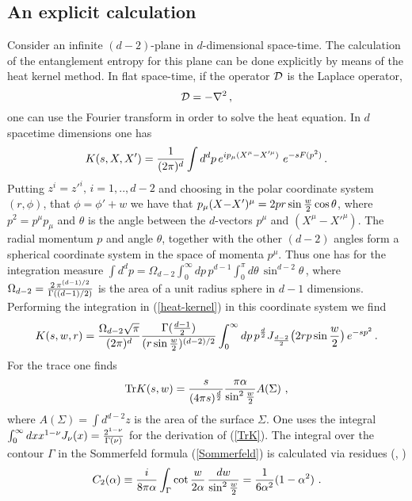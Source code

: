 \documentclass[12pt]{article}
\def\Tr{\hbox{Tr}}
\def\be{\begin{eqnarray}}
\def\ee{\end{eqnarray}}
\def\lb{\label}
\def\o{\over}
\begin{document}
\subsection{An explicit calculation}
\lb{Explicit-calculation}
Consider an infinite $(d-2)$-plane in $d$-dimensional space-time. The calculation of the entanglement entropy for this plane can be done explicitly
by means of the  heat kernel method.
In flat space-time, if the operator $\cal D$ is the Laplace operator,
$$
{\cal D}=-\nabla^2\, ,
$$
 one can use the Fourier transform  in order to solve the heat equation. In $d$ spacetime dimensions one has
 \begin{equation}
  K(s,X,X')={1\over (2\pi)^d}\int d^dp \,e^{ip_\mu(X^\mu{-}X'^\mu)}~e^{-sF(p^2)}\,.
 \lb{heat-kernel}
 \end{equation}
Putting $z^i=z'^i,\, i=1,..,d-2$  and choosing in the polar coordinate system $(r,\phi)$, that $\phi=\phi'+w$ we have that $p_\mu(X{-}X')^\mu=2pr\sin{w\o 2}\cos\theta$, where  $p^2=p^\mu p_\mu$ and $\theta$ is the angle between the $d$-vectors $p^\mu$ and $(X^\mu{-}X'^\mu)$. The radial momentum $p$ and angle $\theta$, together with  the  other $(d{-}2)$ angles  form a spherical coordinate system in the space of momenta $p^\mu$. Thus one has for the integration measure $\int d^dp=\Omega_{d-2}\int_0^\infty dp\,p^{d-1}\int_0^\pi d\theta\,\sin^{d-2}\theta\,$, where 
$\Omega_{d-2}={2\, \pi^{(d-1)/2} \over\Gamma((d-1)/2)}$ is the area of a unit radius sphere in $d{-}1$ dimensions. Performing the integration in (\ref{heat-kernel}) in this coordinate system we find
\be
  K(s,w,r)=\frac{\Omega_{d-2}\sqrt{\pi}}{ (2\pi)^d} \frac{\Gamma({d-1\over 2})}{(r\sin{w\over 2})^{(d-2)/2}}
   \int_0^\infty dp \, 
  p^{\frac{d}{ 2}}J_{\frac{d-2}{2}} \big(2rp\sin\frac{w}{2}\big)\,e^{-sp^2} \,.
 \lb{Kw}
\ee
For the trace one finds
 \begin{equation}
  \Tr K(s,w) = \frac{s}{(4\pi s)^{\frac{d}{2}}} {\pi \alpha\o \sin^2{w\o 2}} A(\Sigma) ~,
 \lb{TrK}
 \end{equation}
where $A(\Sigma )=\int d^{d-2}z$ is the area of the surface $\Sigma$.
One uses the integral $\int_0^\infty dx x^{1-\nu}
J_\nu(x)={2^{1-\nu}\over \Gamma(\nu)}$ for the derivation of (\ref{TrK}). 
The integral over the contour $\Gamma$ in the Sommerfeld formula (\ref{Sommerfeld})
is calculated via residues (\cite{Dowker:1977zj}, \cite{Fursaev:1994in})
 \begin{equation} \lb{C}
  C_2(\alpha)\equiv{ i \over 8\pi\alpha}\int_\Gamma \cot{w\o 2\alpha}\, {dw\o \sin^2{w\o 2}}={1\o 6\alpha^2}(1-\alpha^2)~.
 \end{equation}
\end{document}

